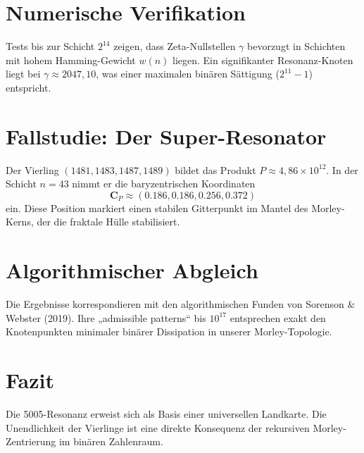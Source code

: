 \documentclass[11pt,a4paper,twocolumn]{article}
\begin{document}
	\section{Numerische Verifikation}
	Tests bis zur Schicht $2^{14}$ zeigen, dass Zeta-Nullstellen $\gamma$ bevorzugt in Schichten mit hohem Hamming-Gewicht $w(n)$ liegen. Ein signifikanter Resonanz-Knoten liegt bei $\gamma \approx 2047,10$, was einer maximalen binären Sättigung ($2^{11}-1$) entspricht.
	
	\section{Fallstudie: Der Super-Resonator}
	Der Vierling $(1481, 1483, 1487, 1489)$ bildet das Produkt $P \approx 4,86 \times 10^{12}$. In der Schicht $n=43$ nimmt er die baryzentrischen Koordinaten
	\[
	\mathbf{C}_{P} \approx (0.186, 0.186, 0.256, 0.372)
	\]
	ein. Diese Position markiert einen stabilen Gitterpunkt im Mantel des Morley-Kerns, der die fraktale Hülle stabilisiert.
	
	\section{Algorithmischer Abgleich}
	Die Ergebnisse korrespondieren mit den algorithmischen Funden von Sorenson \& Webster (2019). Ihre „admissible patterns“ bis $10^{17}$ entsprechen exakt den Knotenpunkten minimaler binärer Dissipation in unserer Morley-Topologie.
	
	\section{Fazit}
	Die 5005-Resonanz erweist sich als Basis einer universellen Landkarte. Die Unendlichkeit der Vierlinge ist eine direkte Konsequenz der rekursiven Morley-Zentrierung im binären Zahlenraum.
	
\end{document}
